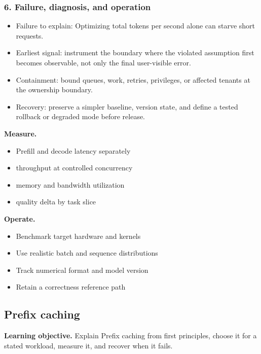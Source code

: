 \subsubsection*{6. Failure, diagnosis, and operation}
\begin{itemize}
\item Failure to explain: Optimizing total tokens per second alone can starve short requests.
\item Earliest signal: instrument the boundary where the violated assumption first becomes observable, not only the final user-visible error.
\item Containment: bound queues, work, retries, privileges, or affected tenants at the ownership boundary.
\item Recovery: preserve a simpler baseline, version state, and define a tested rollback or degraded mode before release.
\end{itemize}
\textbf{Measure.}\begin{itemize}
\item Prefill and decode latency separately
\item throughput at controlled concurrency
\item memory and bandwidth utilization
\item quality delta by task slice
\end{itemize}
\textbf{Operate.}\begin{itemize}
\item Benchmark target hardware and kernels
\item Use realistic batch and sequence distributions
\item Track numerical format and model version
\item Retain a correctness reference path
\end{itemize}
\subsection{Prefix caching}
\textbf{Learning objective.} Explain Prefix caching from first principles, choose it for a stated workload, measure it, and recover when it fails.
